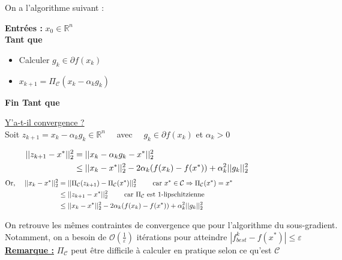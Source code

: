 \documentclass[12pt,a4paper]{article}
\begin{document}
\noindent On a l'algorithme suivant :\\
\begin{algorithm}
    \SetAlgoLined
    \textbf{Entrées :} $x_0 \in \mathbb{R}^n$\\
    \textbf{Tant que}\\
    \begin{itemize}
        \item Calculer $g_k \in \partial f(x_k)$
        \item $x_{k+1} = \Pi_{\mathcal{C}}(x_k - \alpha_k g_k)$
    \end{itemize}
    \textbf{Fin Tant que}\\
\end{algorithm}



\noindent\underline{Y'a-t-il convergence ?}\\
Soit $z_{k+1} = x_k - \alpha_k g_k \in \mathbb{R}^n \quad$ avec $\quad g_k \in \partial f(x_k)$ et $\alpha_k > 0$

\begin{align*}
    ||z_{k+1} - x^*||_2^2 &= ||x_k - \alpha_k g_k - x^*||_2^2 \hspace{14.5cm}\\
    &\leq ||x_k - x^*||_2^2 - 2 \alpha_k (f(x_k) - f(x^*)) + \alpha_k^2 ||g_k||_2^2
\end{align*}
\begin{align*}
    \text{Or, } \quad ||x_k - x^*||_2^2 &= ||\Pi_{\mathcal{C}}(z_{k+1}) - \Pi_{\mathcal{C}}(x^*)||_2^2 \qquad \text{ car } x^* \in \mathcal{C} \Rightarrow \Pi_{\mathcal{C}}(x^*) = x^* \hspace{14.5cm}\\
    &\leq ||z_{k+1} - x^*||_2^2 \qquad \text{ car } \Pi_{\mathcal{C}} \text{ est } 1\text{-lipschitzienne}\\
    &\leq ||x_k - x^*||_2^2 - 2 \alpha_k (f(x_k) - f(x^*)) + \alpha_k^2 ||g_k||_2^2
\end{align*}


On retrouve les mêmes contraintes de convergence que pour l'algorithme du sous-gradient.\\
Notamment, on a besoin de $\mathcal{O}(\frac{1}{\varepsilon})$ itérations pour atteindre $|f^k_{best} - f(x^*)| \leq \varepsilon$\\


\noindent\underline{\textbf{Remarque :}}
$\Pi_{\mathcal{C}}$ peut être difficile à calculer en pratique selon ce qu'est $\mathcal{C}$\\
\end{document}
